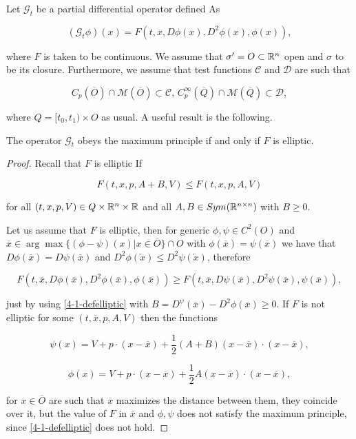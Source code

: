 Let $\mathcal{G}_t$ be a partial differential operator defined As

\begin{equation}\label{4-1-GPDEop}
    (\mathcal{G}_t\phi)(x) = F(t,x,D\phi(x), D^2\phi(x), \phi(x)),
\end{equation}

where $F$ is taken to be continuous. We assume that $\sigma'=O\subset\mathbb{R}^n$ open and $\sigma$ to be its closure. 
Furthermore, we assume that test functions $\mathcal{C}$ and $\mathcal{D}$ are such that

\begin{equation}\label{4-1-condonCandD}
    C_p(\overline{O})\cap\mathcal{M}(\overline{O}) \subset \mathcal{C},\,C_p^{\infty}(\overline{Q})\cap\mathcal{M}(\overline{Q}) \subset \mathcal{D},
\end{equation}

where $Q=[t_0,t_1)\times O$ as usual. A useful result is the following.

\begin{lemma}
    The operator $\mathcal{G}_t$ obeys the maximum principle if and only if $F$ is elliptic.

    \begin{proof}
        Recall that $F$ is elliptic If

        \begin{equation}\label{4-1-defelliptic}
            F(t,x,p,A+B,V) \leq F(t,x,p,A,V)
        \end{equation}

        for all $(t,x,p,V)\in Q\times\mathbb{R}^n\times\mathbb{R}$ and all $A,B\in Sym(\mathbb{R}^{n\times n})$ with $B\geq0$.

        Let us assume that $F$ is elliptic, then for generic $\phi,\psi\in C^2(O)$ and $\overline{x}\in\arg \max\{(\phi-\psi)(x)|x\in\overline{O}\}\cap O$ 
        with $\phi(\overline{x})=\psi(\overline{x})$ we have that $D\phi(\overline{x})=D\psi(\overline{x})$ and $D^2\phi(\overleftarrow{x})\leq D^2\psi(\overleftarrow{x})$, 
        therefore

        \[F(t,\overline{x}, D\phi(\overline{x}), D^2\phi(\overline{x}),\phi(\overline{x}))\geq F(t,\overline{x}, D\psi(\overline{x}), D^2\psi(\overline{x}),\psi(\overline{x})),\]

        just by using \ref{4-1-defelliptic} with $B=D^\psi(\overline{x})-D^2\phi(\overline{x})\geq0$. If $F$ is not elliptic 
        for some $(t,\overline{x},p,A,V)$ then the functions

        \[\psi(x) = V+p\cdot(x-\overline{x}) + \frac{1}{2}(A+B)(x-\overline{x})\cdot(x-\overline{x}),\]

        \[\phi(x) = V+p\cdot(x-\overline{x}) + \frac{1}{2}A(x-\overline{x})\cdot(x-\overline{x}),\]

        for $x\in\overline{O}$ are such that $\overline{x}$ maximizes the distance between them, they coincide over it, but 
        the value of $F$ in $\overline{x}$ and $\phi,\psi$ does not satisfy the maximum principle, since \ref{4-1-defelliptic} 
        does not hold.
    \end{proof}
\end{lemma}

